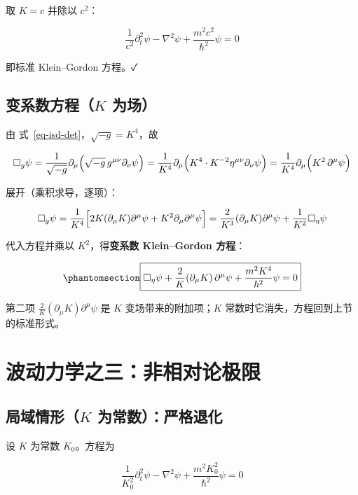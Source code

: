 \documentclass[
  chinese,
  a4paper,
  UTF8,
  12pt,
  oneside,
  openany]{ctexbook}
\theoremstyle{plain}
\theoremstyle{plain}
\theoremstyle{plain}
\theoremstyle{definition}
\theoremstyle{plain}
\theoremstyle{plain}
\theoremstyle{remark}
\begin{document}
取 \(K=c\) 并除以 \(c^{2}\)：

\[
\frac{1}{c^{2}}\partial_t^{2}\psi-\nabla^{2}\psi+\frac{m^{2}c^{2}}{\hbar^{2}}\psi=0
\]

即标准 Klein--Gordon 方程。✓

\subsection{\texorpdfstring{变系数方程（\(K\)
为场）}{变系数方程（K 为场）}}\label{ux53d8ux7cfbux6570ux65b9ux7a0bk-ux4e3aux573a}

由 式~\ref{eq-isd-det}，\(\sqrt{-g}=K^{4}\)，故

\[
\Box_g\psi=\frac{1}{\sqrt{-g}}\partial_\mu\Bigl(\sqrt{-g}\,g^{\mu\nu}\partial_\nu\psi\Bigr)
=\frac{1}{K^{4}}\partial_\mu\Bigl(K^{4}\cdot K^{-2}\eta^{\mu\nu}\partial_\nu\psi\Bigr)
=\frac{1}{K^{4}}\partial_\mu\Bigl(K^{2}\,\partial^{\mu}\psi\Bigr)
\]

展开（乘积求导，逐项）：

\[
\Box_g\psi=\frac{1}{K^{4}}\Bigl[2K(\partial_{\mu}K)\partial^{\mu}\psi+K^{2}\partial_\mu\partial^{\mu}\psi\Bigr]
=\frac{2}{K^{3}}(\partial_{\mu}K)\partial^{\mu}\psi+\frac{1}{K^{2}}\Box_\eta\psi
\]

代入方程并乘以 \(K^{2}\)，得\textbf{变系数 Klein--Gordon 方程}：

\begin{equation}\protect\phantomsection\label{eq-isd-kg}{
\boxed{\Box_\eta\psi+\frac{2}{K}(\partial_{\mu}K)\,\partial^{\mu}\psi+\frac{m^{2}K^{4}}{\hbar^{2}}\psi=0}
}\end{equation}

第二项 \(\frac{2}{K}(\partial_{\mu}K)\partial^{\mu}\psi\) 是 \(K\)
变场带来的附加项；\(K\) 常数时它消失，方程回到上节的标准形式。

\section{波动力学之三：非相对论极限}\label{sec-isd-nr}

\subsection{\texorpdfstring{局域情形（\(K\)
为常数）：严格退化}{局域情形（K 为常数）：严格退化}}\label{ux5c40ux57dfux60c5ux5f62k-ux4e3aux5e38ux6570ux4e25ux683cux9000ux5316}

设 \(K\) 为常数 \(K_0\)。方程为

\[
\frac{1}{K_0^{2}}\partial_t^{2}\psi-\nabla^{2}\psi+\frac{m^{2}K_0^{2}}{\hbar^{2}}\psi=0
\]
\end{document}
